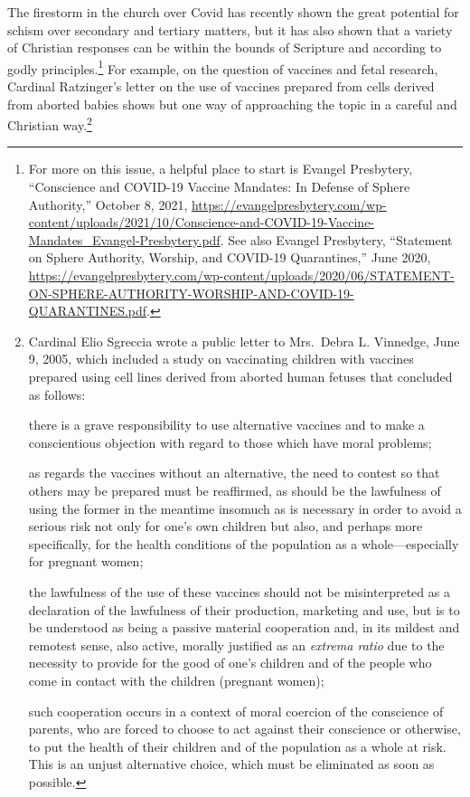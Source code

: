 \documentclass[
]{book}
\begin{document}
The firestorm in the church over Covid has recently shown the great potential for schism over secondary and tertiary matters, but it has also shown that a variety of Christian responses can be within the bounds of Scripture and according to godly principles.\footnote{For more on this issue, a helpful place to start is Evangel Presbytery, ``Conscience and COVID-19 Vaccine Mandates: In Defense of Sphere Authority,'' October 8, 2021, \url{https://evangelpresbytery.com/wp-content/uploads/2021/10/Conscience-and-COVID-19-Vaccine-Mandates_Evangel-Presbytery.pdf}. See also Evangel Presbytery, ``Statement on Sphere Authority, Worship, and COVID-19 Quarantines,'' June 2020, \url{https://evangelpresbytery.com/wp-content/uploads/2020/06/STATEMENT-ON-SPHERE-AUTHORITY-WORSHIP-AND-COVID-19-QUARANTINES.pdf}.} For example, on the question of vaccines and fetal research, Cardinal Ratzinger's letter on the use of vaccines prepared from cells derived from aborted babies shows but one way of approaching the topic in a careful and Christian way.\footnote{Cardinal Elio Sgreccia wrote a public letter to Mrs.~Debra L. Vinnedge, June 9, 2005, which included a study on vaccinating children with vaccines prepared using cell lines derived from aborted human fetuses that concluded as follows:

  there is a grave responsibility to use alternative vaccines and to make a conscientious objection with regard to those which have moral problems;

  as regards the vaccines without an alternative, the need to contest so that others may be prepared must be reaffirmed, as should be the lawfulness of using the former in the meantime insomuch as is necessary in order to avoid a serious risk not only for one's own children but also, and perhaps more specifically, for the health conditions of the population as a whole---especially for pregnant women;

  the lawfulness of the use of these vaccines should not be misinterpreted as a declaration of the lawfulness of their production, marketing and use, but is to be understood as being a passive material cooperation and, in its mildest and remotest sense, also active, morally justified as an \emph{extrema ratio} due to the necessity to provide for the good of one's children and of the people who come in contact with the children (pregnant women);

  such cooperation occurs in a context of moral coercion of the conscience of parents, who are forced to choose to act against their conscience or otherwise, to put the health of their children and of the population as a whole at risk. This is an unjust alternative choice, which must be eliminated as soon as possible.

}
\end{document}
